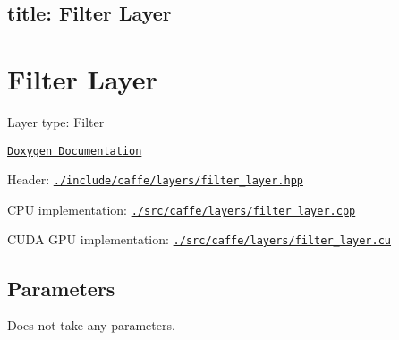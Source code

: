 

 \subsection*{title\+: Filter Layer }

\section*{Filter Layer}


\begin{DoxyItemize}
\item Layer type\+: {\ttfamily Filter}
\item \href{http://caffe.berkeleyvision.org/doxygen/classcaffe_1_1FilterLayer.html}{\tt Doxygen Documentation}
\item Header\+: \href{https://github.com/BVLC/caffe/blob/master/include/caffe/layers/filter_layer.hpp}{\tt {\ttfamily ./include/caffe/layers/filter\+\_\+layer.hpp}}
\item C\+PU implementation\+: \href{https://github.com/BVLC/caffe/blob/master/src/caffe/layers/filter_layer.cpp}{\tt {\ttfamily ./src/caffe/layers/filter\+\_\+layer.cpp}}
\item C\+U\+DA G\+PU implementation\+: \href{https://github.com/BVLC/caffe/blob/master/src/caffe/layers/filter_layer.cu}{\tt {\ttfamily ./src/caffe/layers/filter\+\_\+layer.cu}}
\end{DoxyItemize}

\subsection*{Parameters}

Does not take any parameters. 